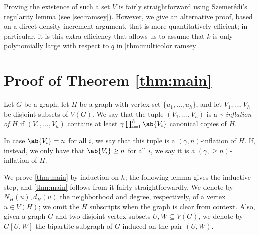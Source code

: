 Proving the existence of such a set $V$ is fairly straightforward using Szemer\'edi's regularity lemma (see \cref{sec:ramsey}). However, we give an alternative proof, based on a direct density-increment argument, that is more quantitatively efficient; in particular, it is this extra efficiency that allows us to assume that $k$ is only polynomially large with respect to $q$ in \cref{thm:multicolor ramsey}.



\section{Proof of Theorem \ref{thm:main}}\label{sec:nikiforov}
\begin{definition}
    Let $G$ be a graph, let $H$ be a graph with vertex set $\{u_1,\dots,u_h\}$, and let $V_1,\dots,V_h$ be disjoint subsets of $V(G)$. We say that the tuple $(V_1,\dots,V_h)$ is a \emph{$\gamma$-inflation of $H$} if $(V_1,\dots,V_h)$ contains at least $\gamma \prod_{i=1}^h \ab{V_i}$ canonical copies of $H$.

    In case $\ab{V_i}=n$ for all $i$, we say that this tuple is a $(\gamma,n)$-inflation of $H$. If, instead, we only have that $\ab{V_i} \geq n$ for all $i$, we say it is a $(\gamma,{\geq n})$-inflation of $H$.
\end{definition}


We prove \cref{thm:main} by induction on $h$; the following lemma gives the inductive step, and \cref{thm:main} follows from it fairly straightforwardly. We denote by $N_H(u),d_H(u)$ the neighborhood and degree, respectively, of a vertex $u \in V(H)$; we omit the $H$ subscripts when the graph is clear from context. Also, given a graph $G$ and two disjoint vertex subsets $U,W \subseteq V(G)$, we denote by $G[U,W]$ the bipartite subgraph of $G$ induced on the pair $(U,W)$. 

